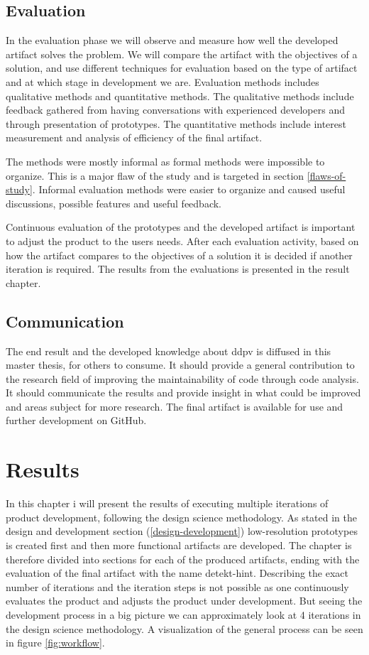 \documentclass{report}
\begin{document}
\section{Evaluation}
In the evaluation phase we will observe and measure how well the developed artifact solves the problem. We will compare the artifact with the objectives of a solution, and use different techniques for evaluation based on the type of artifact and at which stage in development we are. Evaluation methods includes qualitative methods and quantitative methods. The qualitative methods include feedback gathered from having conversations with experienced developers and through presentation of prototypes. The quantitative methods include interest measurement and analysis of efficiency of the final artifact.   

The methods were mostly informal as formal methods were impossible to organize. This is a major flaw of the study and is targeted in section \ref{flaws-of-study}. Informal evaluation methods were easier to organize and caused useful discussions, possible features and useful feedback. 

Continuous evaluation of the prototypes and the developed artifact is important to adjust the product to the users needs. After each evaluation activity, based on how the artifact compares to the objectives of a solution it is decided if another iteration is required. The results from the evaluations is presented in the result chapter.

\section{Communication}
The end result and the developed knowledge about \gls{ddpv} is diffused in this master thesis, for others to consume. It should provide a general contribution to the research field of improving the maintainability of code through code analysis. It should communicate the results and provide insight in what could be improved and areas subject for more research. The final artifact is available for use and further development on GitHub\cite{detekt-hint-repository}.

\chapter{Results}
\label{results}
In this chapter i will present the results of executing multiple iterations of product development, following the design science methodology. As stated in the design and development section (\ref{design-development}) low-resolution 
prototypes is created first and then more functional artifacts are developed. The chapter is therefore divided into sections for each of the produced artifacts, ending with the evaluation of the final artifact with the name detekt-hint. Describing the exact number of iterations and the iteration steps is not possible as one continuously evaluates the product and adjusts the product under development. But seeing the development process in a big picture we can approximately look at 4 iterations in the design science methodology. A visualization of the general process can be seen in figure \ref{fig:workflow}.
\end{document}
